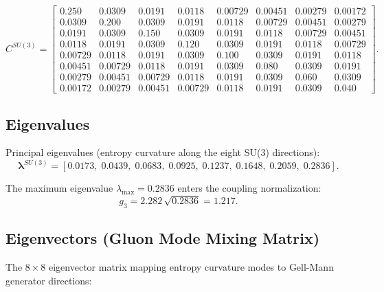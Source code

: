 \documentclass[11pt]{article}
\begin{document}
\begin{equation}
C^{SU(3)} =
\begin{bmatrix}
0.250 & 0.0309 & 0.0191 & 0.0118 & 0.00729 & 0.00451 & 0.00279 & 0.00172 \\
0.0309 & 0.200 & 0.0309 & 0.0191 & 0.0118 & 0.00729 & 0.00451 & 0.00279 \\
0.0191 & 0.0309 & 0.150 & 0.0309 & 0.0191 & 0.0118 & 0.00729 & 0.00451 \\
0.0118 & 0.0191 & 0.0309 & 0.120 & 0.0309 & 0.0191 & 0.0118 & 0.00729 \\
0.00729 & 0.0118 & 0.0191 & 0.0309 & 0.100 & 0.0309 & 0.0191 & 0.0118 \\
0.00451 & 0.00729 & 0.0118 & 0.0191 & 0.0309 & 0.080 & 0.0309 & 0.0191 \\
0.00279 & 0.00451 & 0.00729 & 0.0118 & 0.0191 & 0.0309 & 0.060 & 0.0309 \\
0.00172 & 0.00279 & 0.00451 & 0.00729 & 0.0118 & 0.0191 & 0.0309 & 0.040
\end{bmatrix}.
\end{equation}

\subsection{Eigenvalues}

Principal eigenvalues (entropy curvature along the eight
SU(3) directions):
\begin{equation}
  \boldsymbol{\lambda}^{SU(3)}
  = [0.0173,\; 0.0439,\; 0.0683,\; 0.0925,\;
     0.1237,\; 0.1648,\; 0.2059,\; 0.2836].
\end{equation}

The maximum eigenvalue $\lambda_\text{max}=0.2836$ enters the
coupling normalization:
\begin{equation}
  g_3 = 2.282\,\sqrt{0.2836} = 1.217.
\end{equation}

\subsection{Eigenvectors (Gluon Mode Mixing Matrix)}

The $8\times8$ eigenvector matrix mapping entropy curvature
modes to Gell-Mann generator directions:
\end{document}
